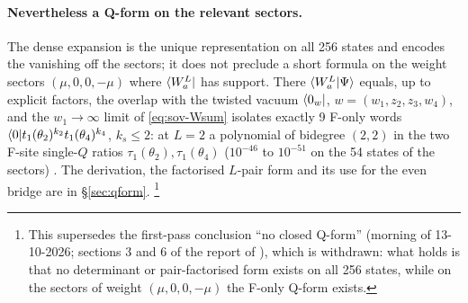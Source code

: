 \paragraph{Nevertheless a Q-form on the relevant sectors.} The dense expansion is the unique representation on all 256 states and encodes the vanishing off the sectors; it does not preclude a short formula on the weight sectors
$(\mu,0,0,-\mu)$ where $\langle W_a^L|$ has support. There $\langle W_a^L|\Psi\rangle$ equals, up to explicit factors, the overlap with the twisted vacuum $\langle0_w|$, $w=(w_1,z_2,z_3,w_4)$, and the $w_1\to\infty$ limit of \eqref{eq:sov-Wsum} isolates exactly 9 F-only words
$\langle0|t_1(\theta_2)^{k_2}t_1(\theta_4)^{k_4}$, $k_s\le2$: at $L=2$ a polynomial of bidegree $(2,2)$ in the two F-site single-$Q$ ratios $\tau_1(\theta_2),\tau_1(\theta_4)$ ($10^{-46}$ to $10^{-51}$ on the 54 states of the sectors) \hp.
The derivation, the factorised $L$-pair form and its use for the even bridge are in \S\ref{sec:qform}.%
\footnote{This supersedes the first-pass conclusion ``no closed Q-form'' (morning of 13-10-2026; sections 3 and 6 of the report of ), which is withdrawn: what holds is that no determinant or
pair-factorised form exists on all 256 states, while on the sectors of weight $(\mu,0,0,-\mu)$ the F-only Q-form exists.}
